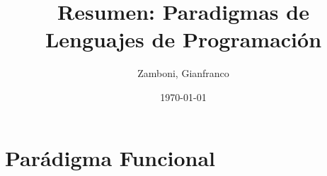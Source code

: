 \documentclass[10pt,a4paper]{book}
\begin{document}
\title{Resumen: Paradigmas de Lenguajes de Programación}

\date{\today}

\author{Zamboni, Gianfranco}
\begin{titlepage}
    \maketitle
    \thispagestyle{empty}
    \tableofcontents
\end{titlepage}

\newpage
\setcounter{page}{1}


\newpage

\chapter{Parádigma Funcional}






\appendix


\newpage

\end{document}
